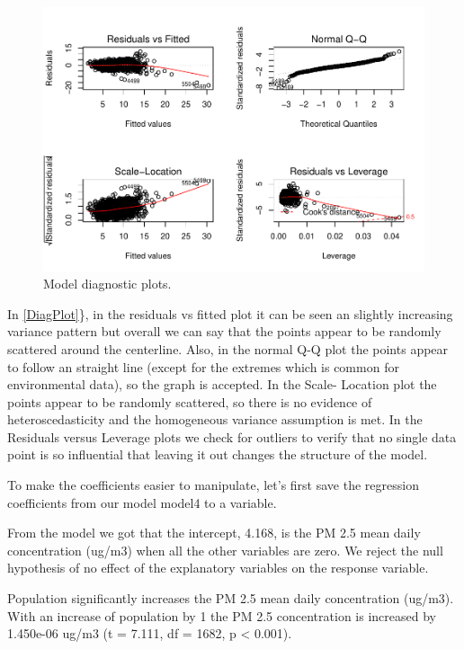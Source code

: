 \documentclass[12pt,]{article}
\begin{document}
\begin{figure}
\centering
\includegraphics{Raby_ENV872_Project_files/figure-latex/unnamed-chunk-59-1.pdf}
\caption{Model diagnostic plots. \label{DiagPlot}}
\end{figure}

In \autoref{DiagPlot}\}, in the residuals vs fitted plot it can be seen
an slightly increasing variance pattern but overall we can say that the
points appear to be randomly scattered around the centerline. Also, in
the normal Q-Q plot the points appear to follow an straight line (except
for the extremes which is common for environmental data), so the graph
is accepted. In the Scale- Location plot the points appear to be
randomly scattered, so there is no evidence of heteroscedasticity and
the homogeneous variance assumption is met. In the Residuals versus
Leverage plots we check for outliers to verify that no single data point
is so influential that leaving it out changes the structure of the
model.

To make the coefficients easier to manipulate, let's first save the
regression coefficients from our model model4 to a variable.

From the model we got that the intercept, 4.168, is the PM 2.5 mean
daily concentration (ug/m3) when all the other variables are zero. We
reject the null hypothesis of no effect of the explanatory variables on
the response variable.

Population significantly increases the PM 2.5 mean daily concentration
(ug/m3). With an increase of population by 1 the PM 2.5 concentration is
increased by 1.450e-06 ug/m3 (t = 7.111, df = 1682, p \textless{}
0.001).
\end{document}
